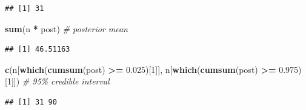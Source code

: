 \documentclass[
]{book}
\newenvironment{Shaded}{\begin{snugshade}}{\end{snugshade}}
\newcommand{\CommentTok}[1]{\textcolor[rgb]{0.56,0.35,0.01}{\textit{#1}}}
\newcommand{\DecValTok}[1]{\textcolor[rgb]{0.00,0.00,0.81}{#1}}
\newcommand{\FloatTok}[1]{\textcolor[rgb]{0.00,0.00,0.81}{#1}}
\newcommand{\FunctionTok}[1]{\textcolor[rgb]{0.13,0.29,0.53}{\textbf{#1}}}
\newcommand{\NormalTok}[1]{#1}
\newcommand{\SpecialCharTok}[1]{\textcolor[rgb]{0.81,0.36,0.00}{\textbf{#1}}}
\begin{document}
\begin{verbatim}
## [1] 31
\end{verbatim}

\begin{Shaded}
\begin{Highlighting}[]
\FunctionTok{sum}\NormalTok{(n }\SpecialCharTok{*}\NormalTok{ post)                                    }\CommentTok{\# posterior mean}
\end{Highlighting}
\end{Shaded}

\begin{verbatim}
## [1] 46.51163
\end{verbatim}

\begin{Shaded}
\begin{Highlighting}[]
\FunctionTok{c}\NormalTok{(n[}\FunctionTok{which}\NormalTok{(}\FunctionTok{cumsum}\NormalTok{(post) }\SpecialCharTok{\textgreater{}=} \FloatTok{0.025}\NormalTok{)[}\DecValTok{1}\NormalTok{]],}
\NormalTok{  n[}\FunctionTok{which}\NormalTok{(}\FunctionTok{cumsum}\NormalTok{(post) }\SpecialCharTok{\textgreater{}=} \FloatTok{0.975}\NormalTok{)[}\DecValTok{1}\NormalTok{]])            }\CommentTok{\# 95\% credible interval}
\end{Highlighting}
\end{Shaded}

\begin{verbatim}
## [1] 31 90
\end{verbatim}
\end{document}
